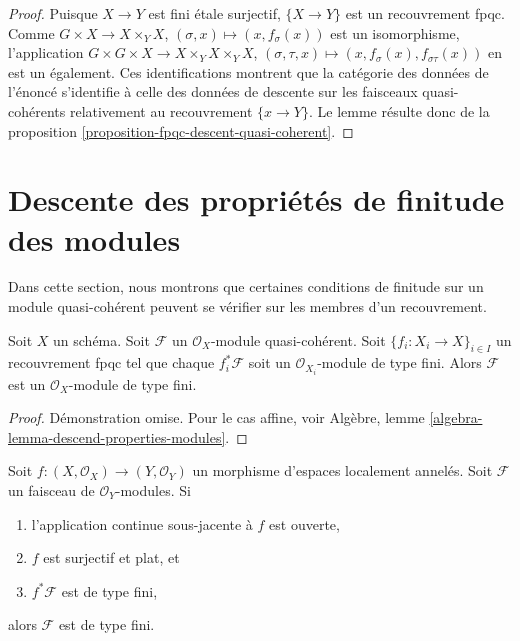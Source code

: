 \begin{proof}
Puisque $X \to Y$ est fini \'etale surjectif, $\{X \to Y\}$
est un recouvrement fpqc. Comme
$G \times X \to X \times_Y X$, $(\sigma, x) \mapsto (x, f_\sigma(x))$
est un isomorphisme, l'application
$G \times G \times X \to X \times_Y X \times_Y X$,
$(\sigma, \tau, x) \mapsto (x, f_\sigma(x), f_{\sigma\tau}(x))$
en est un également. Ces identifications montrent que la catégorie
des données de l'énoncé s'identifie à celle des données de descente
sur les faisceaux quasi-cohérents relativement au recouvrement
$\{x \to Y\}$. Le lemme résulte donc de la proposition
\ref{proposition-fpqc-descent-quasi-coherent}.
\end{proof}









\section{Descente des propriétés de finitude des modules}
\label{section-descent-finiteness}

\noindent
Dans cette section, nous montrons que certaines conditions de finitude
sur un module quasi-cohérent peuvent se vérifier sur les membres d'un
recouvrement.

\begin{lemma}
\label{lemma-finite-type-descends}
Soit $X$ un schéma.
Soit $\mathcal{F}$ un $\mathcal{O}_X$-module quasi-cohérent.
Soit $\{f_i : X_i \to X\}_{i \in I}$ un recouvrement fpqc tel que
chaque $f_i^*\mathcal{F}$ soit un $\mathcal{O}_{X_i}$-module de type fini.
Alors $\mathcal{F}$ est un $\mathcal{O}_X$-module de type fini.
\end{lemma}

\begin{proof}
Démonstration omise. Pour le cas affine, voir
Algèbre, lemme \ref{algebra-lemma-descend-properties-modules}.
\end{proof}

\begin{lemma}
\label{lemma-finite-type-descends-fppf}
Soit $f : (X, \mathcal{O}_X) \to (Y, \mathcal{O}_Y)$ un morphisme
d'espaces localement annelés. Soit $\mathcal{F}$ un faisceau de $\mathcal{O}_Y$-modules.
Si
\begin{enumerate}
\item l'application continue sous-jacente à $f$ est ouverte,
\item $f$ est surjectif et plat, et
\item $f^*\mathcal{F}$ est de type fini,
\end{enumerate}
alors $\mathcal{F}$ est de type fini.
\end{lemma}

